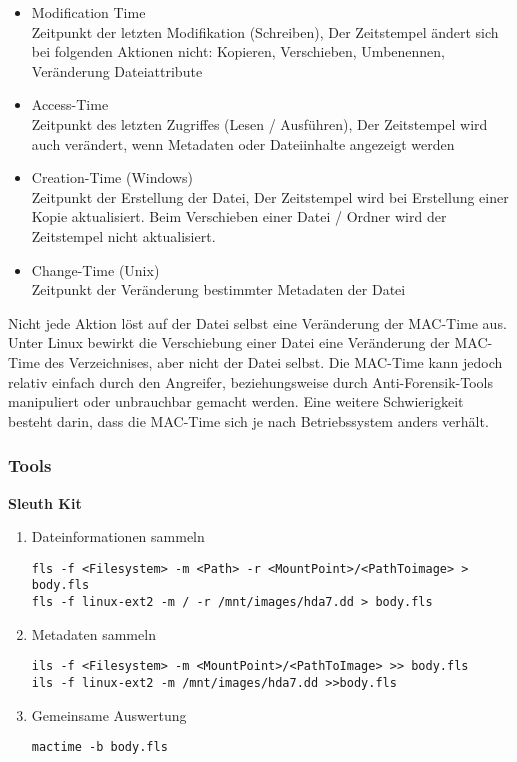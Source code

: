 \begin{itemize}
\item Modification Time\\
Zeitpunkt der letzten Modifikation (Schreiben), Der Zeitstempel ändert sich bei folgenden Aktionen nicht: Kopieren, Verschieben, Umbenennen, Veränderung Dateiattribute
\item Access-Time\\
Zeitpunkt des letzten Zugriffes (Lesen / Ausführen), Der Zeitstempel wird auch verändert, wenn Metadaten oder Dateiinhalte angezeigt werden
\item Creation-Time (Windows)\\
Zeitpunkt der Erstellung der Datei, Der Zeitstempel wird bei Erstellung einer Kopie aktualisiert. Beim Verschieben einer Datei / Ordner wird der Zeitstempel nicht aktualisiert.
\item Change-Time (Unix)\\
Zeitpunkt der Veränderung bestimmter Metadaten der Datei
\end{itemize}

Nicht jede Aktion löst auf der Datei selbst eine Veränderung der MAC-Time aus. Unter Linux bewirkt die Verschiebung einer Datei eine Veränderung der MAC-Time des Verzeichnises, aber nicht der Datei selbst. Die MAC-Time kann jedoch relativ einfach durch den Angreifer, beziehungsweise durch Anti-Forensik-Tools manipuliert oder unbrauchbar gemacht werden. Eine weitere Schwierigkeit besteht darin, dass die MAC-Time sich je nach Betriebssystem anders verhält.

\subsubsection{Tools}
\textbf{Sleuth Kit}
\begin{enumerate}
\item Dateinformationen sammeln
\begin{lstlisting}
fls -f <Filesystem> -m <Path> -r <MountPoint>/<PathToimage> > body.fls
fls -f linux-ext2 -m / -r /mnt/images/hda7.dd > body.fls
\end{lstlisting}

\item Metadaten sammeln
\begin{lstlisting}
ils -f <Filesystem> -m <MountPoint>/<PathToImage> >> body.fls
ils -f linux-ext2 -m /mnt/images/hda7.dd >>body.fls
\end{lstlisting}

\item Gemeinsame Auswertung
\begin{lstlisting}
mactime -b body.fls
\end{lstlisting}

\end{enumerate}


